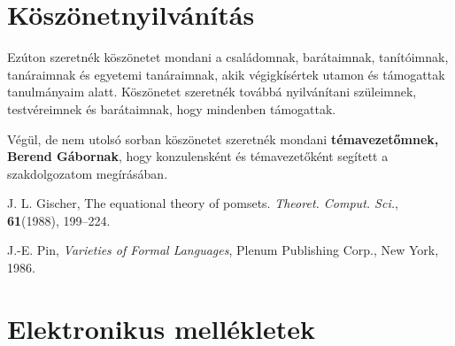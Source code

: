 \documentclass[12pt]{report}
\theoremstyle{definition}
\begin{document}
\chapter*{Köszönetnyilvánítás}

Ezúton szeretnék köszönetet mondani a családomnak, barátaimnak, tanítóimnak, tanáraimnak és egyetemi tanáraimnak, akik végigkísértek utamon és támogattak tanulmányaim alatt. Köszönetet szeretnék továbbá nyilvánítani szüleimnek, testvéreimnek és barátaimnak, hogy mindenben támogattak.

Végül, de nem utolsó sorban köszönetet szeretnék mondani \textbf{témavezetőmnek, Berend Gábornak}, hogy konzulensként és témavezetőként segített a szakdolgozatom megírásában.


%
%




\begin{thebibliography}{9}





J. L. Gischer,
The equational theory of pomsets.
\emph{Theoret. Comput. Sci.}, \textbf{61}(1988), 199--224.

J.-E. Pin,
\emph{Varieties of Formal Languages},
Plenum Publishing Corp., New York, 1986.





\end{thebibliography}

\chapter*{Elektronikus mellékletek}
\end{document}
